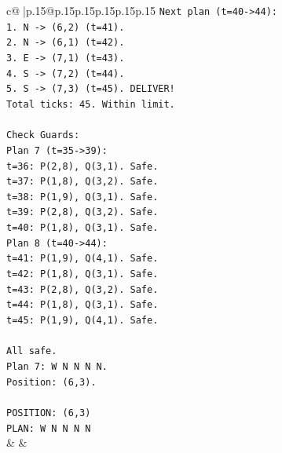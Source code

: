 \documentclass{article}
\begin{document}
{\begin{supertabular}{c@{$\;$}|p{.15\linewidth}@{}p{.15\linewidth}p{.15\linewidth}p{.15\linewidth}p{.15\linewidth}p{.15\linewidth}}
{{{\texttt{Next plan (t=40{-}>44):} \\
\texttt{1. N {-}> (6,2) (t=41).} \\
\texttt{2. N {-}> (6,1) (t=42).} \\
\texttt{3. E {-}> (7,1) (t=43).} \\
\texttt{4. S {-}> (7,2) (t=44).} \\
\texttt{5. S {-}> (7,3) (t=45). DELIVER!} \\
\texttt{Total ticks: 45. Within limit.} \\
\\ 
\texttt{Check Guards:} \\
\texttt{Plan 7 (t=35{-}>39):} \\
\texttt{t=36: P(2,8), Q(3,1). Safe.} \\
\texttt{t=37: P(1,8), Q(3,2). Safe.} \\
\texttt{t=38: P(1,9), Q(3,1). Safe.} \\
\texttt{t=39: P(2,8), Q(3,2). Safe.} \\
\texttt{t=40: P(1,8), Q(3,1). Safe.} \\
\texttt{Plan 8 (t=40{-}>44):} \\
\texttt{t=41: P(1,9), Q(4,1). Safe.} \\
\texttt{t=42: P(1,8), Q(3,1). Safe.} \\
\texttt{t=43: P(2,8), Q(3,2). Safe.} \\
\texttt{t=44: P(1,8), Q(3,1). Safe.} \\
\texttt{t=45: P(1,9), Q(4,1). Safe.} \\
\\ 
\texttt{All safe.} \\
\texttt{Plan 7: W N N N N.} \\
\texttt{Position: (6,3).} \\
\\ 
\texttt{POSITION: (6,3)} \\
\texttt{PLAN: W N N N N} \\
            }
        }
    }
    & & \\ \\


\end{supertabular}}
\end{document}
